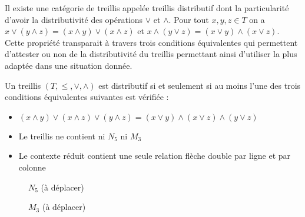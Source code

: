 Il existe une catégorie de treillis appelée treillis distributif dont la particularité d'avoir la distributivité des opérations $\vee$ et $\wedge$. Pour tout $x, y, z \in T$ on a $x \vee (y \wedge z) = (x \wedge y) \vee (x \wedge z)$ et $x \wedge (y \vee z) = (x\vee y) \wedge (x \vee z)$. Cette propriété transparait à travers trois conditions équivalentes qui permettent d'attester ou non de la distributivité du treillis permettant ainsi d'utiliser la plus adaptée dans une situation donnée.

\begin{definition}
Un treillis $(T, \leq, \vee, \wedge)$ est distributif si et seulement si au moins l'une des trois conditions équivalentes suivantes est vérifiée :
\begin{itemize}
	\item $(x \wedge y) \vee (x \wedge z) \vee (y \wedge z) = (x \vee y) \wedge (x \vee z) \wedge (y \vee z)$
	\item Le treillis ne contient ni $N_5$ ni $M_3$
	\item Le contexte réduit contient une seule relation flèche double par ligne et par colonne
\end{itemize}
\end{definition}

\begin{figure}[H]
	\begin{minipage}[t]{0.5\textwidth}
		\begin{center}
		\end{center}
		\caption{$N_5$ (à déplacer)}
	\end{minipage}
	\begin{minipage}[t]{0.5\textwidth}
		\begin{center}
		\end{center}
		\caption{$M_3$ (à déplacer)}
	\end{minipage}
\end{figure}

